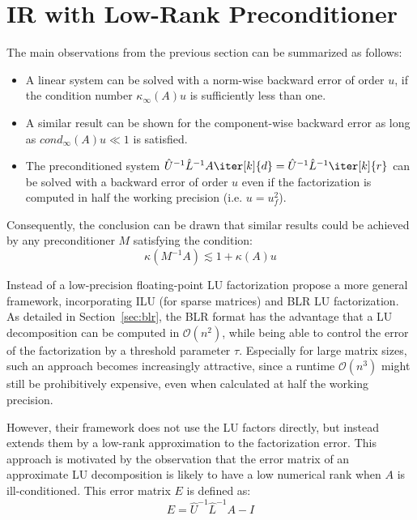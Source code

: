 \section{IR with Low-Rank Preconditioner}
\label{sec:low_rank_ir}

The main observations from the previous section can be summarized as follows:
\begin{itemize}
    \item A linear system can be solved with a norm-wise backward error of order $u$, if the condition number $\kappa_\infty(A)u$ is sufficiently less than one.
    \item A similar result can be shown for the component-wise backward error as long as $cond_\infty(A)u \ll 1$ is satisfied.
    \item The preconditioned system $ \hat{U}^{-1}\hat{L}^{-1}A\iter[k]{d}=\hat{U}^{-1}\hat{L}^{-1}\iter[k]{r}$ can be solved with a backward error of order $u$ even if the factorization is computed in half the working precision (i.e. $u=u_f^2$).
\end{itemize}

\noindent Consequently, the conclusion can be drawn that similar results could be achieved by any preconditioner $M$ satisfying the condition:
\begin{equation}
    \kappa(M^{-1}A)\lesssim 1 + \kappa(A)u
\end{equation}

\noindent Instead of a low-precision floating-point LU factorization \cite{higham_new_2019} propose a more general framework, incorporating ILU (for sparse matrices) and BLR LU factorization. As detailed in Section~\hyperref[sec:blr]{\ref{sec:blr}}, the BLR format has the advantage that a LU decomposition can be computed in $\mathcal{O}(n^2)$, while being able to control the error of the factorization by a threshold parameter $\tau$. Especially for large matrix sizes, such an approach becomes increasingly attractive, since a runtime $\mathcal{O}(n^3)$ might still be prohibitively expensive, even when calculated at half the working precision. 

However, their framework does not use the LU factors directly, but instead extends them by a low-rank approximation to the factorization error. This approach is motivated by the observation that the error matrix of an approximate LU decomposition is likely to have a low numerical rank when $A$ is ill-conditioned. This error matrix $E$ is defined as:
\begin{equation}
    E=\hat{U}^{-1}\hat{L}^{-1}A-I
\end{equation}

